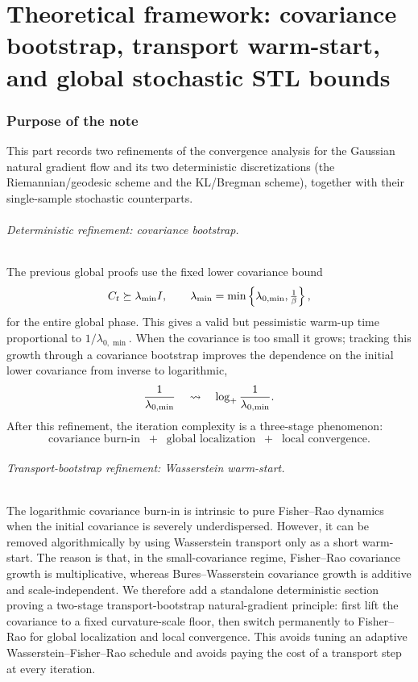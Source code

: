 
\part{Theoretical framework: covariance bootstrap, transport warm-start, and global stochastic STL bounds}
\label{part:theory}

\section{Purpose of the note}

This part records two refinements of the convergence analysis for the Gaussian natural
gradient flow and its two deterministic discretizations (the Riemannian/geodesic scheme
and the KL/Bregman scheme), together with their single-sample stochastic counterparts.

\paragraph{Deterministic refinement: covariance bootstrap.}
The previous global proofs use the fixed lower covariance bound
\[
    C_t\succeq \lambda_{\min}I,
    \qquad
    \lambda_{\min}
    =
    \min\left\{
        \lambda_{0,\min},\tfrac1\beta
    \right\},
\]
for the entire global phase. This gives a valid but pessimistic warm-up time
proportional to $1/\lambda_{0,\min}$. When the covariance is too small it grows; tracking
this growth through a covariance bootstrap improves the dependence on the initial lower
covariance from inverse to logarithmic,
\[
    \frac1{\lambda_{0,\min}}
    \quad\leadsto\quad
    \log_+\frac1{\lambda_{0,\min}}.
\]
After this refinement, the iteration complexity is a three-stage phenomenon:
\[
    \boxed{
    \text{covariance burn-in}
    \;\;+\;\;
    \text{global localization}
    \;\;+\;\;
    \text{local convergence}.
    }
\]

\paragraph{Transport-bootstrap refinement: Wasserstein warm-start.}
The logarithmic covariance burn-in is intrinsic to pure Fisher--Rao dynamics when the
initial covariance is severely underdispersed. However, it can be removed algorithmically
by using Wasserstein transport only as a short warm-start. The reason is that, in the
small-covariance regime, Fisher--Rao covariance growth is multiplicative, whereas
Bures--Wasserstein covariance growth is additive and scale-independent. We therefore add a
standalone deterministic section proving a two-stage transport-bootstrap natural-gradient
principle: first lift the covariance to a fixed curvature-scale floor, then switch permanently
to Fisher--Rao for global localization and local convergence. This avoids tuning an adaptive
Wasserstein--Fisher--Rao schedule and avoids paying the cost of a transport step at every
iteration.

